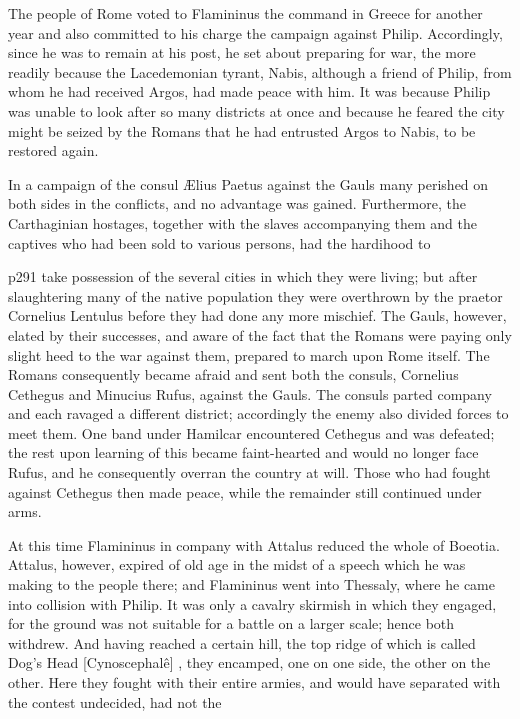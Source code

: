 The people of Rome voted to Flamininus the command in Greece for another year and also committed to his charge the campaign against Philip. Accordingly, since he was to remain at his post, he set about preparing for war, the more readily because the Lacedemonian tyrant, Nabis, although a friend of Philip, from whom he had received Argos, had made peace with him. It was because Philip was unable to look after so many districts at once and because he feared the city might be seized by the Romans that he had entrusted Argos to Nabis, to be restored again.

In a campaign of the consul Ælius Paetus against the Gauls many perished on both sides in the conflicts, and no advantage was gained. Furthermore, the Carthaginian hostages, together with the slaves accompanying them and the captives who had been sold to various persons, had the hardihood to

p291 take possession of the several cities in which they were living; but after slaughtering many of the native population they were overthrown by the praetor Cornelius Lentulus\texthebrew{⁠} before they had done any more mischief. The Gauls, however, elated by their successes, and aware of the fact that the Romans were paying only slight heed to the war against them, prepared to march upon Rome itself. The Romans consequently became afraid and sent both the consuls, Cornelius Cethegus and Minucius Rufus, against the Gauls. The consuls parted company and each ravaged a different district; accordingly the enemy also divided forces to meet them. One band under Hamilcar encountered Cethegus and was defeated; the rest upon learning of this became faint-hearted and would no longer face Rufus, and he consequently overran the country at will. Those who had fought against Cethegus then made peace, while the remainder still continued under arms.

At this time Flamininus in company with Attalus reduced the whole of Boeotia. Attalus, however, expired of old age in the midst of a speech which he was making to the people there; and Flamininus went into Thessaly, where he came into collision with Philip. It was only a cavalry skirmish in which they engaged, for the ground was not suitable for a battle on a larger scale; hence both withdrew. And having reached a certain hill, the top ridge of which is called Dog's Head [Cynoscephalê] , they encamped, one on one side, the other on the other. Here they fought with their entire armies, and would have separated with the contest undecided, had not the

